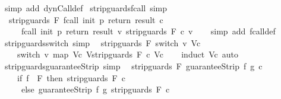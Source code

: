 \begin{isabellebody}
%
\isatagproof
{}\isamarkupfalse%
\ {\isacharparenleft}simp\ add{\isacharcolon}\ dynCall{\isacharunderscore}def{\isacharparenright}%
\endisatagproof
{\isafoldproof}%
%
\isadelimproof
\isanewline
%
\endisadelimproof
\isanewline
{}\isamarkupfalse%
\ strip{\isacharunderscore}guards{\isacharunderscore}fcall\ {\isacharbrackleft}simp{\isacharbrackright}{\isacharcolon}\isanewline
\ \ {\isachardoublequoteopen}strip{\isacharunderscore}guards\ F\ {\isacharparenleft}fcall\ init\ p\ return\ result\ c{\isacharparenright}\ {\isacharequal}\isanewline
\ \ \ \ \ fcall\ init\ p\ return\ result\ {\isacharparenleft}{\isasymlambda}v{\isachardot}\ strip{\isacharunderscore}guards\ F\ {\isacharparenleft}c\ v{\isacharparenright}{\isacharparenright}{\isachardoublequoteclose}\isanewline
%
\isadelimproof
\ \ %
\endisadelimproof
%
\isatagproof
{}\isamarkupfalse%
\ {\isacharparenleft}simp\ add{\isacharcolon}\ fcall{\isacharunderscore}def{\isacharparenright}%
\endisatagproof
{\isafoldproof}%
%
\isadelimproof
\isanewline
%
\endisadelimproof
\isanewline
{}\isamarkupfalse%
\ strip{\isacharunderscore}guards{\isacharunderscore}switch\ {\isacharbrackleft}simp{\isacharbrackright}{\isacharcolon}\isanewline
\ \ {\isachardoublequoteopen}strip{\isacharunderscore}guards\ F\ {\isacharparenleft}switch\ v\ Vc{\isacharparenright}\ {\isacharequal}\isanewline
\ \ \ \ switch\ v\ {\isacharparenleft}map\ {\isacharparenleft}{\isasymlambda}{\isacharparenleft}V{\isacharcomma}c{\isacharparenright}{\isachardot}\ {\isacharparenleft}V{\isacharcomma}strip{\isacharunderscore}guards\ F\ c{\isacharparenright}{\isacharparenright}\ Vc{\isacharparenright}{\isachardoublequoteclose}\isanewline
%
\isadelimproof
\ \ %
\endisadelimproof
%
\isatagproof
{}\isamarkupfalse%
\ {\isacharparenleft}induct\ Vc{\isacharparenright}\ auto%
\endisatagproof
{\isafoldproof}%
%
\isadelimproof
\isanewline
%
\endisadelimproof
\isanewline
{}\isamarkupfalse%
\ strip{\isacharunderscore}guards{\isacharunderscore}guaranteeStrip\ {\isacharbrackleft}simp{\isacharbrackright}{\isacharcolon}\isanewline
\ \ {\isachardoublequoteopen}strip{\isacharunderscore}guards\ F\ {\isacharparenleft}guaranteeStrip\ f\ g\ c{\isacharparenright}\ {\isacharequal}\ \isanewline
\ \ \ \ {\isacharparenleft}if\ f\ {\isasymin}\ F\ then\ strip{\isacharunderscore}guards\ F\ c\ \isanewline
\ \ \ \ \ else\ guaranteeStrip\ f\ g\ {\isacharparenleft}strip{\isacharunderscore}guards\ F\ c{\isacharparenright}{\isacharparenright}{\isachardoublequoteclose}\isanewline
%
\isadelimproof
\ \ %
\endisadelimproof

\end{isabellebody}

